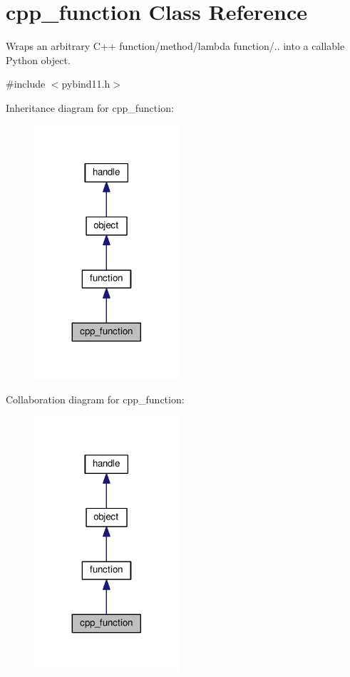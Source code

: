 \hypertarget{classcpp__function}{}\section{cpp\+\_\+function Class Reference}
\label{classcpp__function}


Wraps an arbitrary C++ function/method/lambda function/.. into a callable Python object.  




{\ttfamily \#include $<$pybind11.\+h$>$}



Inheritance diagram for cpp\+\_\+function\+:
\nopagebreak
\begin{figure}[H]
\begin{center}
\leavevmode
\includegraphics[width=152pt]{classcpp__function__inherit__graph}
\end{center}
\end{figure}


Collaboration diagram for cpp\+\_\+function\+:
\nopagebreak
\begin{figure}[H]
\begin{center}
\leavevmode
\includegraphics[width=152pt]{classcpp__function__coll__graph}
\end{center}
\end{figure}
